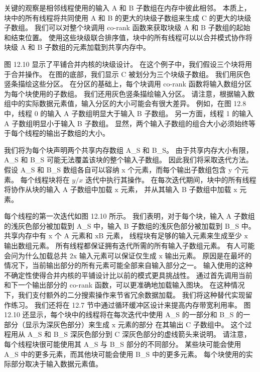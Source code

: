 关键的观察是相邻线程使用的输入 A 和 B 子数组在内存中彼此相邻。 
本质上，块中的所有线程将共同使用 A 和 B 的更大的块级子数组来生成 $\mathrm{C}$ 的更大的块级子数组。 
我们可以对整个块调用 co-rank 函数来获取块级 A 和 B 子数组的起始和结束位置。 
使用这些块级联合排序值，块中的所有线程可以以合并模式协作将块级 A 和 B 子数组的元素加载到共享内存中。

图 12.10 显示了平铺合并内核的块级设计。 在这个例子中，我们假设三个块将用于合并操作。 
在图的底部，我们显示 $\mathrm{C}$ 被划分为三个块级子数组。 我们用灰色竖条描绘这些分区。 
在分区的基础上，每个块调用 co-rank 函数将输入数组分区为每个块使用的子数组。 我们还用灰色竖条描绘输入分区。 
请注意，根据输入数组中的实际数据元素值，输入分区的大小可能会有很大差异。 
例如，在图 12.8 中，线程 0 的输入 A 子数组明显大于输入 B 子数组。 
另一方面，线程 1 的输入 A 子数组明显小于输入 B 子数组。
显然，两个输入子数组的组合大小必须始终等于每个线程的输出子数组的大小。

我们将为每个块声明两个共享内存数组 A\_S 和 B\_S。 
由于共享内存大小有限，A\_S 和 B\_S 可能无法覆盖该块的整个输入子数组。 
因此我们将采取迭代方法。 假设 A\_S 和 B\_S 数组各自可以容纳 x 个元素，而每个输出子数组包含 y 个元素。 
每个线程块将在 $y / x$ 迭代中执行其操作。 
在每次迭代期间，块中的所有线程将协作从块的输入 A 子数组中加载 $\mathrm{x}$ 元素，
并从其输入 B 子数组中加载 $\mathrm{x}$ 元素。

每个线程的第一次迭代如图 12.10 所示。 
我们表明，对于每个块，输入 A 子数组的浅灰色部分被加载到 A\_S 中，输入 B 子数组的浅灰色部分被加载到 B\_S 中。 
共享内存中有 x 个 A 元素和 $\mathrm{x} \mathrm{B}$ 元素，
线程块有足够的输入元素来生成至少 $\mathrm{x}$ 输出数组元素。 
所有线程都保证拥有迭代所需的所有输入子数组元素。 
有人可能会问为什么加载总共 $2 \mathrm{x}$ 输入元素可以保证仅生成 $\mathrm{x}$ 输出元素。 
原因是在最坏的情况下，当前输出部分的所有元素可能全部来自输入部分之一。 
输入使用的这种不确定性使得合并内核的平铺设计比以前的模式更具挑战性。 
通过首先调用当前和下一个输出部分的 co-rank 函数，可以更准确地加载输入图块。 
在这种情况下，我们支付额外的二分搜索操作来节省冗余数据加载。 我们将这种替代实现留作练习。 
我们还将在 12.7 节中通过循环缓冲区设计来提高内存带宽利用率。 
图 12.10 还显示，每个块中的线程将在每次迭代中使用 A\_S 的一部分和 B\_S 的一部分（显示为深灰色部分）来生成 $\mathrm{x}$ 元素的部分 在其输出 $\mathrm{C}$ 子数组中。 
这个过程用从 A\_S 和 B\_S 深灰色部分到 C 深灰色部分的虚线箭头来说明。 
请注意，每个线程块很可能使用其 A\_S 与 B\_S 部分的不同部分。 
某些块可能会使用 A\_S 中的更多元素，而其他块可能会使用 B\_S 中的更多元素。 每个块使用的实际部分取决于输入数据元素值。

